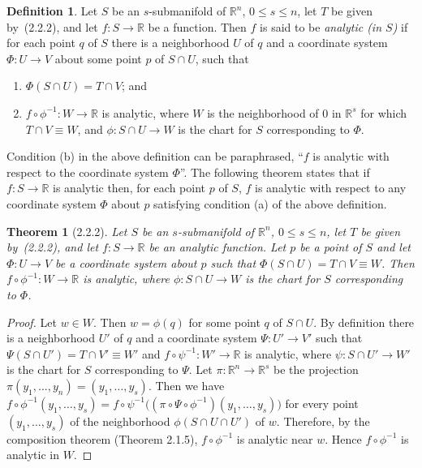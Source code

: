 \documentclass[11pt]{article}
\theoremstyle{plain}
\newtheorem*{theorem*}{Theorem}
\theoremstyle{definition}
\newtheorem*{definition}{Definition}
\newcommand{\R}{\mathbb{R}}
\begin{document}
\begin{definition}
Let $S$ be an $s$-submanifold of $\R^n$, $0 \le s \le n$, let $T$ be
given by~(2.2.2), and let $f: S \to \R$ be a function. Then $f$ is said
to be \emph{analytic (in $S$)} if for each point $q$ of $S$ there is a
neighborhood $U$ of $q$ and a coordinate system $\Phi: U \to V$ about
some point $p$ of $S \cap U$, such that
\begin{enumerate}
\item[(a)] $\Phi(S \cap U) = T \cap V$; and
\item[(b)] $f \circ \phi^{-1}: W \to \R$ is analytic, where $W$ is the
neighborhood of $0$ in $\R^s$ for which $T \cap V \equiv W$, and
$\phi: S \cap U \to W$ is the chart for $S$ corresponding to $\Phi$.
\end{enumerate}
\end{definition}

Condition (b) in the above definition can be paraphrased, ``$f$ is
analytic with respect to the coordinate system $\Phi$''. The following
theorem states that if $f: S \to \R$ is analytic then, for each point
$p$ of $S$, $f$ is analytic with respect to any coordinate system
$\Phi$ about $p$ satisfying condition (a) of the above definition.

\begin{theorem*}[2.2.2]
Let $S$ be an $s$-submanifold of $\R^n$, $0 \le s \le n$, let $T$ be
given by~(2.2.2), and let $f: S \to \R$ be an analytic function. Let $p$
be a point of $S$ and let $\Phi: U \to V$ be a coordinate system about
$p$ such that $\Phi(S \cap U) = T \cap V \equiv W$. Then
$f \circ \phi^{-1}: W \to \R$ is analytic, where $\phi: S \cap U \to W$
is the chart for $S$ corresponding to $\Phi$.
\end{theorem*}

\begin{proof}
Let $w \in W$. Then $w = \phi(q)$ for some point $q$ of $S \cap U$. By
definition there is a neighborhood $U'$ of $q$ and a coordinate system
$\Psi: U' \to V'$ such that $\Psi(S \cap U') = T \cap V' \equiv W'$ and
$f \circ \psi^{-1}: W' \to \R$ is analytic, where $\psi: S \cap U' \to W'$
is the chart for $S$ corresponding to $\Psi$. Let $\pi: \R^n \to \R^s$
be the projection $\pi(y_1, \ldots, y_n) = (y_1, \ldots, y_s)$. Then we
have
$f \circ \phi^{-1}(y_1, \ldots, y_s)
= f \circ \psi^{-1}\bigl((\pi \circ \Psi \circ \phi^{-1})(y_1, \ldots, y_s)\bigr)$
for every point $(y_1, \ldots, y_s)$ of the neighborhood
$\phi(S \cap U \cap U')$ of $w$. Therefore, by the composition theorem
(Theorem 2.1.5), $f \circ \phi^{-1}$ is analytic near $w$. Hence
$f \circ \phi^{-1}$ is analytic in $W$.
\end{proof}
\end{document}
